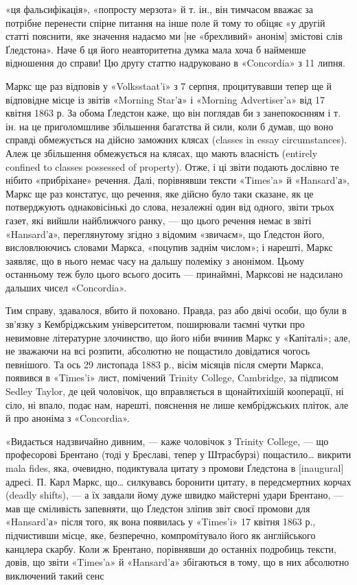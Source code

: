 \parcont{}  %
«ця фальсифікація», «попросту мерзота» й т. ін., він тимчасом
вважає за потрібне перенести спірне питання на інше поле й тому
то обіцяє «у другій статті пояснити, яке значення надаємо ми
[не «брехливий» анонім] змістові слів Ґледстона». Наче б ця
його неавторитетна думка мала хоча б найменше відношення до
справи! Цю другу статтю надруковано в «Concordia» з 11 липня.

Маркс ще раз відповів у «Volksstaat’i» з 7 серпня, процитувавши
тепер ще й відповідне місце із звітів «Morning Star’а» і
«Morning Advertiser’a» від 17 квітня 1863 р. За обома Ґледстон
каже, що він поглядав би з занепокоєнням і т. ін. на це приголомшливе
збільшення багатства й сили, коли б думав, що воно
справді обмежується на дійсно заможних клясах (classes in essay
circumstances). Алеж це збільшення обмежується на клясах,
що мають власність (entirely confined to classes possessed of
property). Отже, і ці звіти подають дослівно те нібито «прибріхане»
речення. Далі, порівнявши тексти «Times’a» й «Hansard’а»,
Маркс ще раз констатує, що речення, яке дійсно було
таки сказане, як це потверджують однаковісінькі до слова, незалежні
один від одного, звіти трьох газет, які вийшли найближчого
ранку, — що цього речення немає в звіті «Hansard’а», переглянутому
згідно з відомим «звичаєм», що Ґледстон його,
висловлюючись словами Маркса, «поцупив заднім числом»; і
нарешті, Маркс заявляє, що в нього немає часу на дальшу полеміку
з анонімом. Цьому останньому теж було цього всього досить —
принаймні, Марксові не надсилано дальших чисел «Concordia».

Тим справу, здавалося, вбито й поховано. Правда, раз або
двічі особи, що були в зв’язку з Кембріджським університетом,
поширювали таємні чутки про невимовне літературне злочинство,
що його ніби вчинив Маркс у «Капіталі»; але, не зважаючи на
всі розпити, абсолютно не пощастило довідатися чогось певнішого.
Та ось 29 листопада 1883 р., вісім місяців після смерти
Маркса, появився в «Times’i» лист, помічений Trinity College,
Cambridge, за підписом Sedley Taylor, де цей чоловічок, що вправляється
в щонайтихішій кооперації, ні сіло, ні впало, подає нам,
нарешті, пояснення не лише кембріджських пліток, але й про
аноніма з «Concordia».

«Видається надзвичайно дивним, — каже чоловічок з Trinity
College, — що професорові Брентано (тоді у Бреславі, тепер у
Штрасбурзі) пощастило\dots{} викрити mala fides, яка, очевидно,
подиктувала цитату з промови Ґледстона в [inaugural] адресі.
П. Карл Маркс, що\dots{} силкувавсь боронити цитату, в передсмертних
корчах (deadly shifts), — а їх завдали йому дуже швидко
майстерні удари Брентано, — мав ще сміливість запевняти, що
Ґледстон зліпив звіт своєї промови для «Hansard’а» після того,
як вона появилась у «Times’i» 17 квітня 1863 р., підчистивши
місце, яке, безперечно, компромітувало його як англійського
канцлера скарбу. Коли ж Брентано, порівнявши до останніх
подробиць тексти, довів, що звіти «Times’a» й «Hansard’а» збігаються
в тому, що в них абсолютно виключений такий сенс
\parbreak{}  %
